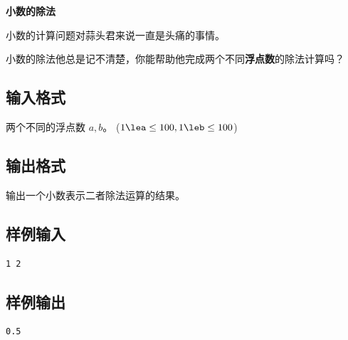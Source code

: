 \documentclass{article}
\newcommand{\problemname}[1]{\begin{center}\Large\bfseries #1\end{center}}
\begin{document}
\problemname{小数的除法}

小数的计算问题对蒜头君来说一直是头痛的事情。

小数的除法他总是记不清楚，你能帮助他完成两个不同\textbf{浮点数}的除法计算吗？

\subsection*{输入格式}
两个不同的浮点数 $a,b$。 ($1\lea\le100,1\leb\le100$)

\subsection*{输出格式}
输出一个小数表示二者除法运算的结果。

\subsection*{样例输入}
\begin{verbatim}
1 2
\end{verbatim}

\subsection*{样例输出}
\begin{verbatim}
0.5
\end{verbatim}
\end{document}
